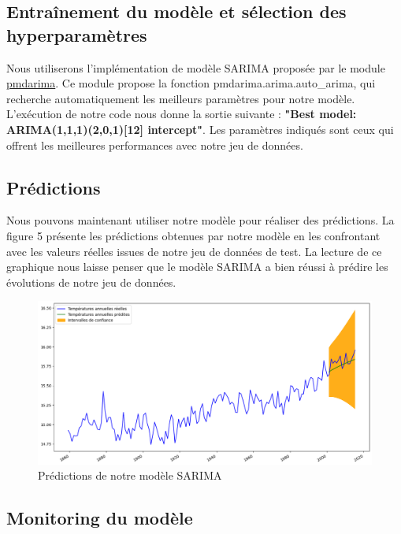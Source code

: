 \documentclass[french]{article}
\begin{document}
    \subsection{Entraînement du modèle et sélection des hyperparamètres}

    Nous utiliserons l'implémentation de modèle SARIMA proposée par le module \href{https://pypi.org/project/pmdarima/}{pmdarima}. Ce module propose la fonction pmdarima.arima.auto\_arima, qui recherche automatiquement les meilleurs paramètres pour notre modèle.
    L'exécution de notre code nous donne la sortie suivante : \textbf{"Best model:  ARIMA(1,1,1)(2,0,1)[12] intercept"}. Les paramètres indiqués sont ceux qui offrent les meilleures performances avec notre jeu de données.

    \subsection{Prédictions}

    Nous pouvons maintenant utiliser notre modèle pour réaliser des prédictions. La figure 5 présente les prédictions obtenues par notre modèle en les confrontant avec les valeurs réelles issues de notre jeu de données de test. La lecture de ce graphique nous laisse penser que le modèle SARIMA a bien réussi à prédire les évolutions de notre jeu de données.

    \begin{figure}[h]
        \includegraphics[width=12cm]{forecast}
        \centering
        \caption{Prédictions de notre modèle SARIMA}
        \centering
    \end{figure}

    \subsection{Monitoring du modèle}
    
\end{document}
